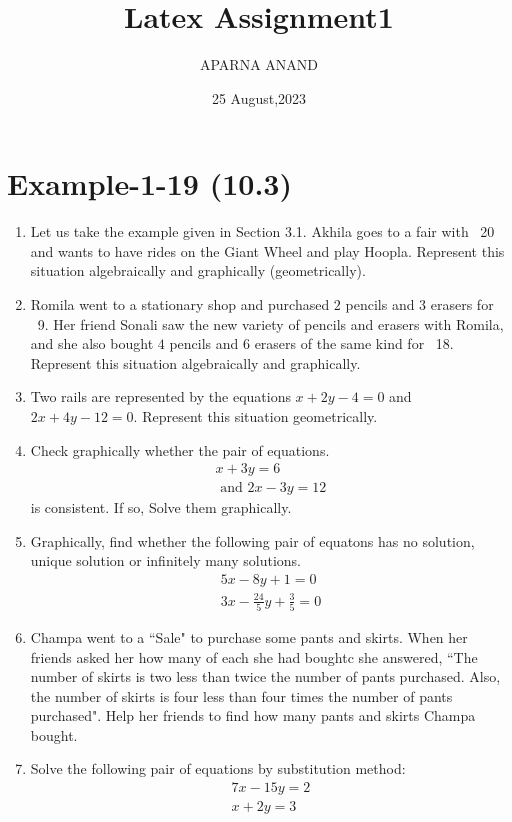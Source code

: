 \documentclass{article}
\theoremstyle{remark}
\begin{document}
\title{Latex Assignment1}
\author{APARNA ANAND}
\date{25 August,2023}
\maketitle
\section*{Example-1-19 (10.3)}
\begin{enumerate}
\item Let us take the example given in Section 3.1. Akhila goes to a fair with \rupee~20 and wants to have rides on the Giant Wheel and play Hoopla. Represent this situation algebraically and graphically (geometrically).
\item Romila went to a stationary shop and purchased $2$ pencils and $3$ erasers for \rupee~9. Her friend Sonali saw the new variety of pencils and erasers with Romila, and she also bought $4$ pencils and $6$ erasers of the same kind for \rupee~18. Represent this situation algebraically and graphically.
\item Two rails are represented by the equations $x+2y-4=0$ and $2x+4y-12=0$. Represent this situation geometrically.
\item Check graphically whether the pair of equations.
\begin{align}
x+3y = 6 \\ \text{ and } 2x-3y = 12
\end{align}
is consistent. If so, Solve them graphically.
\item Graphically, find whether the following pair of equatons has no solution, unique solution or infinitely many solutions.
\begin{align}
5x-8y+1 = 0 \\ 3x-\frac{24}{5}y+\frac{3}{5} = 0
\end{align}
\item Champa went to a ``Sale" to purchase some pants and skirts. When her friends asked her how many of each she had boughtc she answered, ``The number of skirts is two less than twice the number of pants purchased. Also, the number of skirts is four less than four times the number of pants purchased". Help her friends to find how many pants and skirts Champa bought.
\item Solve the following pair of equations by substitution method:
\begin{align}
7x-15y = 2 \\  x+2y = 3
\end{align}

\end{enumerate}
\end{document}
